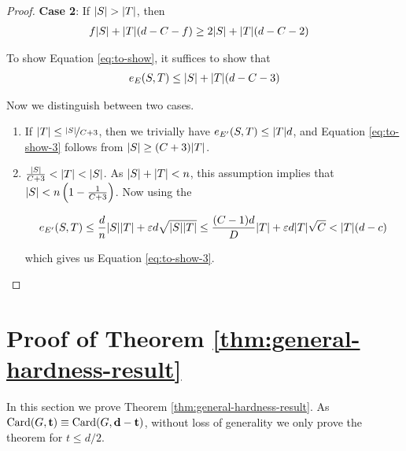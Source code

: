 \documentclass[11pt]{article}
\begin{document}
\begin{proof}
\textbf{Case 2}: If $\Size{S} > \Size{T}$, then 
  \begin{align}
    f\Size{S} +  \Size{T}(d-C-f)  &\ge 2\Size{S} +\Size{T}(d-C-2) \label{eq:to-show-2}
  \end{align}
  
  To show Equation \eqref{eq:to-show}, it suffices to show that
\begin{align}
  \CutEdges{S}{T}{E} \leq \Size{S} + \Size{T}(d-C-3) \label{eq:to-show-3}
\end{align}

Now we distinguish between two cases.

\begin{enumerate}

\item{
    If $\Size{T} \le \nicefrac{\Size{S}}{C+3}$, then we trivially have $\CutEdges{S}{T}{E'} \leq \Size{T}d$, and Equation \eqref{eq:to-show-3} follows from $\Size{S} \geq (C+3)\Size{T}$.
  }

\item{
$ \frac{\Size{S}}{C+3} < \Size{T} < \Size{S}$. As $\Size{S} + \Size{T} < n$, this assumption implies that $\Size{S} < n\left(1 - \frac{1}{C+3}\right)$.
Now using the 

\[ \CutEdges{S}{T}{E'} \le \frac{d}{n}\Size{S}\Size{T} + \epsilon d \sqrt{\Size{S}\Size{T}} \le \frac{(C-1)d}{D}\Size{T} + \epsilon d \Size{T}\sqrt{C} < \Size{T}(d-c)\]

which gives us Equation \eqref{eq:to-show-3}.
  }
  
\end{enumerate}
\end{proof}  



\section{Proof of Theorem \ref{thm:general-hardness-result}}
\label{sec:main-proof}

In this section we prove Theorem \ref{thm:general-hardness-result}. As $\Card{G, \vec{t}} \equiv \Card{G, \vec{d-t}}$, without loss of generality we only prove the theorem for $t \le d/2$. 
\end{document}
